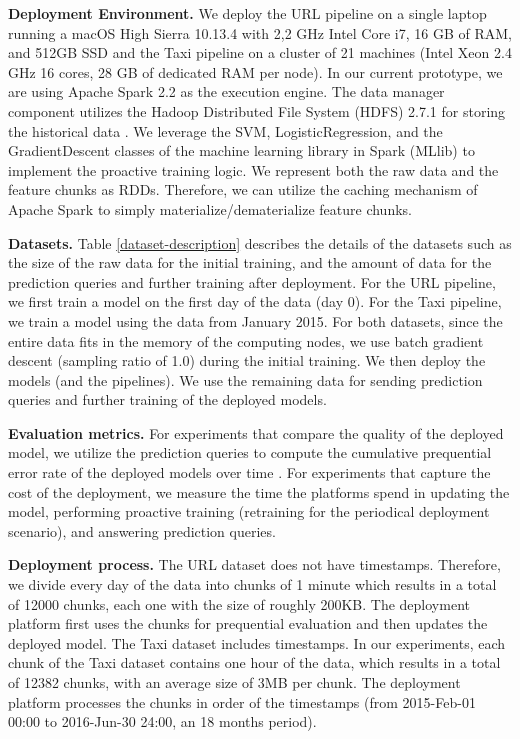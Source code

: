 \textbf{Deployment Environment. }
We deploy the URL pipeline on a single laptop running a macOS High Sierra 10.13.4 with 2,2 GHz Intel Core i7, 16 GB of RAM, and 512GB SSD and the Taxi pipeline on a cluster of 21 machines (Intel Xeon 2.4 GHz 16 cores, 28 GB of dedicated RAM per node).
In our current prototype, we are using Apache Spark 2.2 as the execution engine.
The data manager component utilizes the Hadoop Distributed File System (HDFS) 2.7.1 for storing the historical data \cite{shvachko2010hadoop}.
We leverage the SVM, LogisticRegression, and the GradientDescent classes of the machine learning library in Spark (MLlib) to implement the proactive training logic.
We represent both the raw data and the feature chunks as RDDs.
Therefore, we can utilize the caching mechanism of Apache Spark to simply materialize/dematerialize feature chunks.

\textbf{Datasets. }
Table \ref{dataset-description} describes the details of the datasets such as the size of the raw data for the initial training, and the amount of data for the prediction queries and further training after deployment. 
For the URL pipeline, we first train a model on the first day of the data (day 0).
For the Taxi pipeline, we train a model using the data from January 2015.
For both datasets, since the entire data fits in the memory of the computing nodes, we use batch gradient descent (sampling ratio of 1.0) during the initial training.
We then deploy the models (and the pipelines).
We use the remaining data for sending prediction queries and further training of the deployed models.

\textbf{Evaluation metrics. }
For experiments that compare the quality of the deployed model, we utilize the prediction queries to compute the cumulative prequential error rate of the deployed models over time \cite{dawid1984present}.
For experiments that capture the cost of the deployment, we measure the time the platforms spend in updating the model, performing proactive training (retraining for the periodical deployment scenario), and answering prediction queries.

\textbf{Deployment process.}
The URL dataset does not have timestamps. 
Therefore, we divide every day of the data into chunks of 1 minute which results in a total of 12000 chunks, each one with the size of roughly 200KB.
The deployment platform first uses the chunks for prequential evaluation and then updates the deployed model.
The Taxi dataset includes timestamps. 
In our experiments, each chunk of the Taxi dataset contains one hour of the data, which results in a total of 12382 chunks, with an average size of 3MB per chunk. 
The deployment platform processes the chunks in order of the timestamps (from 2015-Feb-01  00:00 to 2016-Jun-30 24:00, an 18 months period).

